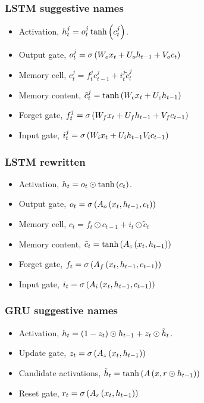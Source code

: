 \documentclass{beamer}
\begin{document}
\frame
{
   \frametitle{LSTM suggestive names}

   \begin{itemize}
      \item<1-> Activation, $h^j_t = o^j_t \tanh \left({c^j_t}\right)$.
      
      \item<2-> Output gate, $o^j_t = \sigma \left({W_o x_t + U_o h_{t-1} + V_o c_t}\right)$

      \item<3-> Memory cell, $c^j_t = f^j_t c^j_{t-1} + i^j_t \tilde c^j_t$

      \item<4-> Memory content, $\tilde c^j_t = \tanh \left({W_c x_t + U_c h_{t-1}}\right)$

      \item<5-> Forget gate, $f^j_t = \sigma \left({W_f x_t + U_f h_{t-1} + V_f c_{t-1}}\right)$

      \item<6-> Input gate, $i^j_t = \sigma \left({W_i x_t + U_i h_{t-1} V_i c_{t-1}}\right)$

   \end{itemize}
}

\frame
{
   \frametitle{LSTM rewritten}

   \begin{itemize}
      \item<1-> Activation, $h_t = o_t \odot \tanh \left({c_t}\right)$.
      
      \item<2-> Output gate, $o_t = \sigma \left({A_o \left({x_t, h_{t-1}, c_t}\right)}\right)$

      \item<3-> Memory cell, $c_t = f_t \odot c_{t-1} + i_t \odot \tilde c_t$

      \item<4-> Memory content, $\tilde c_t = \tanh \left({A_c \left({x_t, h_{t-1}}\right)}\right)$

      \item<5-> Forget gate, $f_t = \sigma \left({ A_f \left({x_t, h_{t-1}, c_{t-1}}\right)}\right)$

      \item<6-> Input gate, $i_t = \sigma \left({ A_i \left({x_t, h_{t-1}, c_{t-1}}\right)}\right)$

   \end{itemize}
}

\frame
{
   \frametitle{GRU suggestive names}

   \begin{itemize}
      \item<1-> Activation, $h_t = \left({1 - z_t}\right) \odot h_{t-1} + z_t \odot \tilde h_t$.
      
      \item<2-> Update gate, $z_t = \sigma \left({A_z \left({x_t, h_{t-1}}\right)}\right)$

      \item<3-> Candidate activations, $\tilde h_t = \tanh \left({A \left({x, r \odot h_{t-1}}\right)}\right)$

      \item<4-> Reset gate, $r_t = \sigma \left({A_r \left({x_t, h_{t-1}}\right)}\right)$

   \end{itemize}
}
\end{document}
